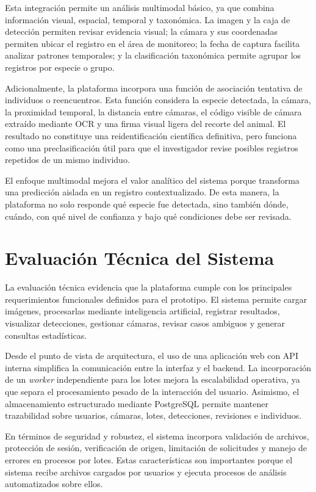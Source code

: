 Esta integración permite un análisis multimodal básico, ya que combina información visual, espacial, temporal y taxonómica. La imagen y la caja de detección permiten revisar evidencia visual; la cámara y sus coordenadas permiten ubicar el registro en el área de monitoreo; la fecha de captura facilita analizar patrones temporales; y la clasificación taxonómica permite agrupar los registros por especie o grupo.

Adicionalmente, la plataforma incorpora una función de asociación tentativa de individuos o reencuentros. Esta función considera la especie detectada, la cámara, la proximidad temporal, la distancia entre cámaras, el código visible de cámara extraído mediante OCR y una firma visual ligera del recorte del animal. El resultado no constituye una reidentificación científica definitiva, pero funciona como una preclasificación útil para que el investigador revise posibles registros repetidos de un mismo individuo.

El enfoque multimodal mejora el valor analítico del sistema porque transforma una predicción aislada en un registro contextualizado. De esta manera, la plataforma no solo responde qué especie fue detectada, sino también dónde, cuándo, con qué nivel de confianza y bajo qué condiciones debe ser revisada.

\section{Evaluación Técnica del Sistema}
\label{sec:evaluacion_tecnica_sistema}

La evaluación técnica evidencia que la plataforma cumple con los principales requerimientos funcionales definidos para el prototipo. El sistema permite cargar imágenes, procesarlas mediante inteligencia artificial, registrar resultados, visualizar detecciones, gestionar cámaras, revisar casos ambiguos y generar consultas estadísticas.

Desde el punto de vista de arquitectura, el uso de una aplicación web con API interna simplifica la comunicación entre la interfaz y el backend. La incorporación de un \textit{worker} independiente para los lotes mejora la escalabilidad operativa, ya que separa el procesamiento pesado de la interacción del usuario. Asimismo, el almacenamiento estructurado mediante PostgreSQL permite mantener trazabilidad sobre usuarios, cámaras, lotes, detecciones, revisiones e individuos.

En términos de seguridad y robustez, el sistema incorpora validación de archivos, protección de sesión, verificación de origen, limitación de solicitudes y manejo de errores en procesos por lotes. Estas características son importantes porque el sistema recibe archivos cargados por usuarios y ejecuta procesos de análisis automatizados sobre ellos.

